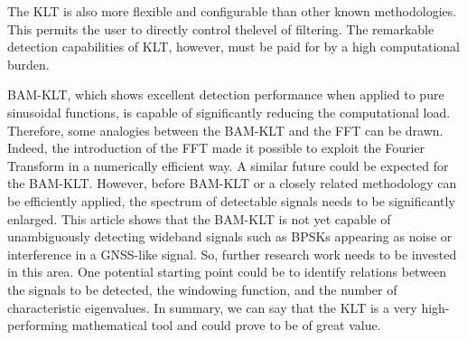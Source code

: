 \documentclass[12pt]{report}
\begin{document}
The KLT is also more flexible and configurable than other known methodologies. This permits the user to directly control thelevel of filtering. The remarkable detection capabilities of KLT, however, must be paid for by a high computational burden.

BAM-KLT, which shows excellent detection performance when applied to pure sinusoidal functions, is capable of significantly reducing the computational load. Therefore, some analogies between the BAM-KLT and the FFT can be drawn. Indeed, the introduction of the FFT made it possible to exploit the Fourier Transform in a numerically efficient way.
A similar future could be expected for the BAM-KLT. However, before BAM-KLT or a closely related methodology can be efficiently applied, the spectrum of detectable signals needs to be significantly enlarged. This article shows that the BAM-KLT is not yet capable of unambiguously detecting wideband signals such as BPSKs appearing as noise or interference in a GNSS-like signal. So, further research work needs to be invested in this area. One potential starting point could be to identify relations between the signals to be detected, the windowing function, and the number of characteristic eigenvalues.
In summary, we can say that the KLT is a very high-performing mathematical tool and could prove to be of great value.
\end{document}
